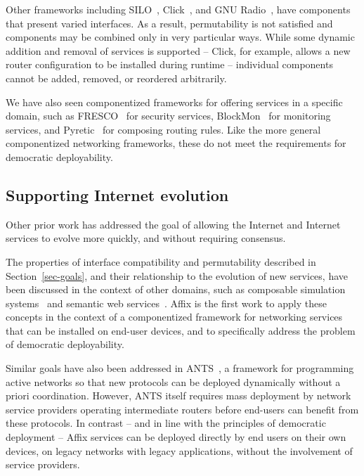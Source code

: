 Other frameworks including 
SILO~\cite{dutta2007silo, baldine2007unified},
Click~\cite{Fu_TOCS_2002},
and GNU Radio~\cite{blossom2004gnu},
have components that present varied interfaces.
As a result, permutability is not satisfied and components 
may be combined only in very particular ways.
While some dynamic addition and removal of services 
is supported -- Click, for example, 
allows a new router configuration to be installed during 
runtime -- individual components cannot be added, 
removed, or reordered arbitrarily. 

We have also seen componentized frameworks
for offering services in a specific domain, 
such as FRESCO~\cite{fresco_2013} for security services,
BlockMon~\cite{blockmon_2013} for monitoring services, 
and Pyretic~\cite{monsanto_composing_2013} for composing 
routing rules.
Like the more general componentized networking 
frameworks, these do not meet the requirements
for democratic deployability.

\subsection{Supporting Internet evolution}

Other prior work has addressed the goal of allowing 
the Internet and Internet services to evolve
more quickly, and without requiring consensus.

The properties of interface compatibility
and permutability described in Section~\ref{sec-goals}, 
and their relationship to the evolution of new services,
have been discussed in the context of other domains, 
such as composable simulation systems~\cite{petty_composability_2003}
and semantic web services~\cite{medjahed_multilevel_2005}.
Affix is the first work to apply these concepts
in the context of a componentized framework 
for networking services that can be installed on 
end-user devices, and to specifically address the problem 
of democratic deployability.

Similar goals have also been addressed in 
ANTS~\cite{ants,Wetherall_SOSP_1999},
a framework for programming active networks so that
new protocols can be deployed dynamically without 
a priori coordination. However, ANTS itself 
requires mass deployment by network service 
providers operating intermediate routers before 
end-users can benefit from these protocols.
In contrast -- and in line with the principles 
of democratic deployment --  Affix services can 
be deployed directly by end users on their own devices, 
on legacy networks with legacy applications,
without the involvement of service providers.

